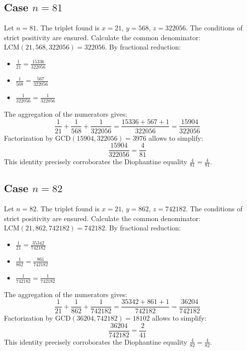 \documentclass[11pt,a4paper]{article}
\begin{document}
\subsection{Case $n = 81$}
Let $n = 81$. The triplet found is $x = 21$, $y = 568$, $z = 322056$.
The conditions of strict positivity are ensured.
Calculate the common denominator: $\text{LCM}(21, 568, 322056) = 322056$.
By fractional reduction:
\begin{itemize}
    \item $\frac{1}{21} = \frac{15336}{322056}$
    \item $\frac{1}{568} = \frac{567}{322056}$
    \item $\frac{1}{322056} = \frac{1}{322056}$
\end{itemize}
The aggregation of the numerators gives:
$$ \frac{1}{21} + \frac{1}{568} + \frac{1}{322056} = \frac{15336 + 567 + 1}{322056} = \frac{15904}{322056} $$
Factorization by $\text{GCD}(15904, 322056) = 3976$ allows to simplify:
$$ \frac{15904}{322056} = \frac{4}{81} $$
This identity precisely corroborates the Diophantine equality $\frac{4}{81} = \frac{4}{81}$.

\subsection{Case $n = 82$}
Let $n = 82$. The triplet found is $x = 21$, $y = 862$, $z = 742182$.
The conditions of strict positivity are ensured.
Calculate the common denominator: $\text{LCM}(21, 862, 742182) = 742182$.
By fractional reduction:
\begin{itemize}
    \item $\frac{1}{21} = \frac{35342}{742182}$
    \item $\frac{1}{862} = \frac{861}{742182}$
    \item $\frac{1}{742182} = \frac{1}{742182}$
\end{itemize}
The aggregation of the numerators gives:
$$ \frac{1}{21} + \frac{1}{862} + \frac{1}{742182} = \frac{35342 + 861 + 1}{742182} = \frac{36204}{742182} $$
Factorization by $\text{GCD}(36204, 742182) = 18102$ allows to simplify:
$$ \frac{36204}{742182} = \frac{2}{41} $$
This identity precisely corroborates the Diophantine equality $\frac{4}{82} = \frac{4}{82}$.
\end{document}
